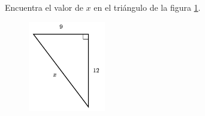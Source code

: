 \question[15]  Encuentra el valor de $x$ en el triángulo de la figura \ref{fig:lados_pitagoras_04}.
\begin{figure}[H]
    \begin{center}
        \includegraphics[width=0.3\textwidth]{../images/lados_pitagoras_04.png}
    \end{center}
    \caption{}
    \label{fig:lados_pitagoras_04}
\end{figure}
